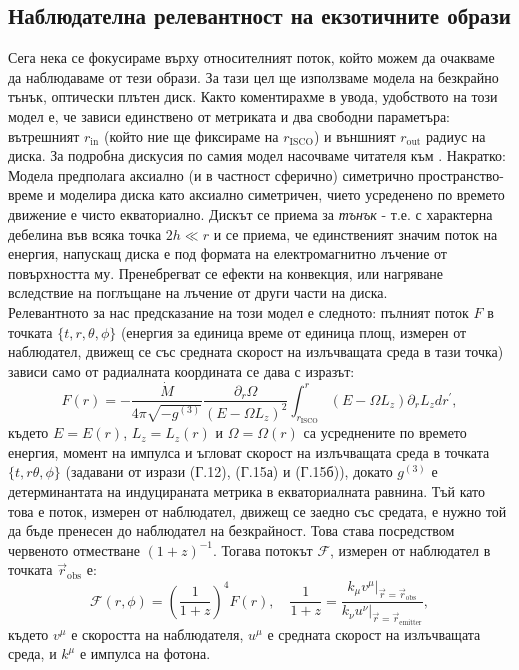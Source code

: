 \subsection{Наблюдателна релевантност на екзотичните образи}

Сега нека се фокусираме върху относителният поток, който можем да очакваме да наблюдаваме от тези образи. За тази цел ще използваме модела на безкрайно тънък, оптически плътен диск. Както коментирахме в увода, удобството на този модел е, че зависи единствено от метриката и два свободни параметъра: вътрешният $r_\text{in}$ (който ние ще фиксираме на $r_\text{ISCO}$) и външният $r_\text{out}$ радиус на диска. За подробна дискусия по самия модел насочваме читателя към \cite{Page1973}. Накратко:\\

Модела предполага аксиално (и в частност сферично) симетрично пространство-време и моделира диска като аксиално симетричен, чието усреденено по времето движение е чисто екваториално. Дискът се приема за \emph{тънък} - т.е. с характерна дебелина във всяка точка $2h \ll r$ и се приема, че единственият значим поток на енергия, напускащ диска е под формата на електромагнитно лъчение от повърхността му. Пренебрегват се ефекти на конвекция, или нагряване вследствие на поглъщане на лъчение от други части на диска.\\

Релевантното за нас предсказание на този модел е следното: пълният поток $F$ в точката $\{t,r,\theta,\phi\}$ (енергия за единица време от единица площ, измерен от наблюдател, движещ се със средната скорост на излъчващата среда в тази точка) зависи само от радиалната координата се дава с изразът:
\begin{equation}
	F(r) = - \frac{\dot{M}}{4\pi\sqrt{-g^{(3)}}}\frac{\partial_r\Omega}{\left(E - \Omega L_z\right)^2}\int_{r_\text{ISCO}}^r \left(E - \Omega L_z\right)\partial_rL_zdr^\prime,
\end{equation}
където $E = E(r)$, $L_z = L_z(r)$ и $\Omega = \Omega(r)$ са усреднените по времето енергия, момент на импулса и ъгловат скорост на излъчващата среда в точката $\{t,r\theta,\phi\}$ (задавани от изрази (Г.12), (Г.15а) и (Г.15б)), докато $g^{(3)}$ е детерминантата на индуцираната метрика в екваториалната равнина. Тъй като това е поток, измерен от наблюдател, движещ се заедно със средата, е нужно той да бъде пренесен до наблюдател на безкрайност. Това става посредством червеното отместване $(1 + z)^{-1}$. Тогава потокът $\mathcal{F}$, измерен от наблюдател в точката $\vec{r}_{\text{obs}}$ е:
\begin{equation}
	\mathcal{F}(r,\phi) = \left(\frac{1}{1+z} \right)^4 F(r),\quad \frac{1}{1 + z} = \frac{k_\mu v^\mu\vert_{\vec{r} = \vec{r}_\text{obs}}}{k_\nu u^\nu\vert_{\vec{r} = \vec{r}_\text{emitter}}},
\end{equation}
където $v^\mu$ е скоростта на наблюдателя, $u^\mu$ е средната скорост на излъчващата среда, и $k^\mu$ е импулса на фотона.\\

